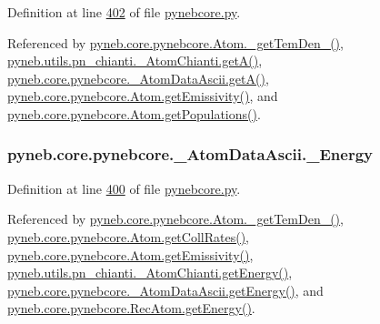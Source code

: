 Definition at line \hyperlink{pynebcore_8py_source_l00402}{402} of file \hyperlink{pynebcore_8py_source}{pynebcore.\+py}.



Referenced by \hyperlink{pynebcore_8py_source_l01803}{pyneb.\+core.\+pynebcore.\+Atom.\+\_\+get\+Tem\+Den\+\_()}, \hyperlink{pn__chianti_8py_source_l00296}{pyneb.\+utils.\+pn\+\_\+chianti.\+\_\+\+Atom\+Chianti.\+get\+A()}, \hyperlink{pynebcore_8py_source_l00475}{pyneb.\+core.\+pynebcore.\+\_\+\+Atom\+Data\+Ascii.\+get\+A()}, \hyperlink{pynebcore_8py_source_l01716}{pyneb.\+core.\+pynebcore.\+Atom.\+get\+Emissivity()}, and \hyperlink{pynebcore_8py_source_l01496}{pyneb.\+core.\+pynebcore.\+Atom.\+get\+Populations()}.

\hypertarget{classpyneb_1_1core_1_1pynebcore_1_1___atom_data_ascii_af9153c0218e68a785d82510cb2ee6248}{}
\subsubsection[{\+\_\+\+Energy}]{\setlength{\rightskip}{0pt plus 5cm}pyneb.\+core.\+pynebcore.\+\_\+\+Atom\+Data\+Ascii.\+\_\+\+Energy\hspace{0.3cm}{\ttfamily [private]}}\label{classpyneb_1_1core_1_1pynebcore_1_1___atom_data_ascii_af9153c0218e68a785d82510cb2ee6248}


Definition at line \hyperlink{pynebcore_8py_source_l00400}{400} of file \hyperlink{pynebcore_8py_source}{pynebcore.\+py}.



Referenced by \hyperlink{pynebcore_8py_source_l01803}{pyneb.\+core.\+pynebcore.\+Atom.\+\_\+get\+Tem\+Den\+\_()}, \hyperlink{pynebcore_8py_source_l01329}{pyneb.\+core.\+pynebcore.\+Atom.\+get\+Coll\+Rates()}, \hyperlink{pynebcore_8py_source_l01716}{pyneb.\+core.\+pynebcore.\+Atom.\+get\+Emissivity()}, \hyperlink{pn__chianti_8py_source_l00346}{pyneb.\+utils.\+pn\+\_\+chianti.\+\_\+\+Atom\+Chianti.\+get\+Energy()}, \hyperlink{pynebcore_8py_source_l00525}{pyneb.\+core.\+pynebcore.\+\_\+\+Atom\+Data\+Ascii.\+get\+Energy()}, and \hyperlink{pynebcore_8py_source_l02811}{pyneb.\+core.\+pynebcore.\+Rec\+Atom.\+get\+Energy()}.

\hypertarget{classpyneb_1_1core_1_1pynebcore_1_1___atom_data_ascii_ac3e956654089ac966a877dbaa003e3ea}{}
